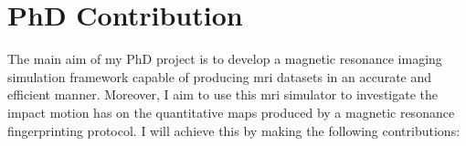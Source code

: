 \begin{enumerate}


\end{enumerate}

\section{PhD Contribution}\label{chapterlabel1sec2}

The main aim of my PhD project is to develop a magnetic resonance imaging simulation framework capable of producing \ac{mri} datasets in an accurate and efficient manner.
Moreover, I aim to use this \ac{mri} simulator to investigate the impact motion 
has on the quantitative maps produced by a magnetic resonance fingerprinting protocol.
I will achieve this by making the following contributions:


